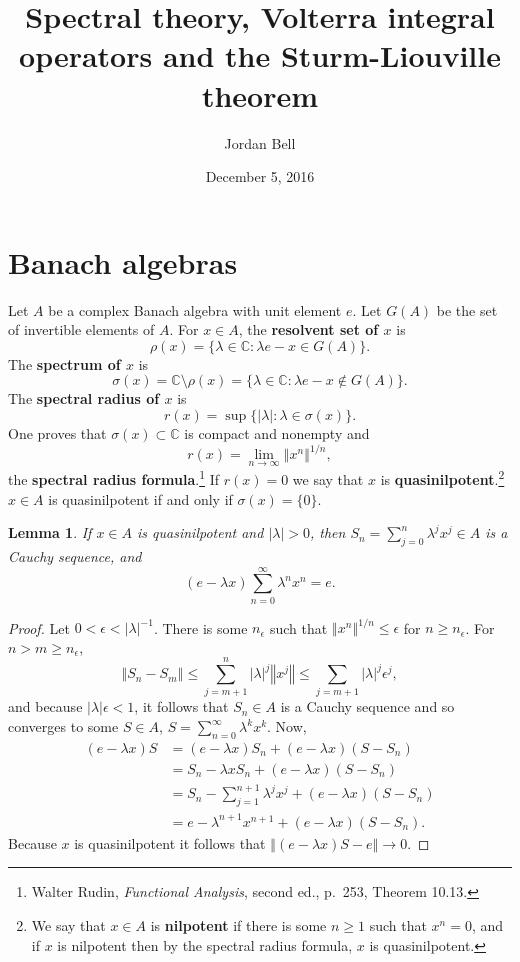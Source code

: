 \documentclass{article}
\newcommand{\norm}[1]{\left\Vert #1 \right\Vert}
\newtheorem{lemma}[theorem]{Lemma}
\theoremstyle{definition}
\begin{document}
\title{Spectral theory, Volterra integral operators and the Sturm-Liouville theorem}
\author{Jordan Bell}
\date{December 5, 2016}

\maketitle

\section{Banach algebras}
Let $A$ be a complex Banach algebra with unit element $e$. 
Let $G(A)$ be the set of invertible elements of $A$.
For $x \in A$, the \textbf{resolvent set of $x$} is
\[
\rho(x) = \{\lambda \in \mathbb{C}: \lambda e-x  \in G(A)\}.
\]
The 
\textbf{spectrum of $x$} is
\[
\sigma(x) = \mathbb{C} \setminus \rho(x) = \{ \lambda \in \mathbb{C}: \lambda e-x  \not \in G(A)\}.
\]
The \textbf{spectral radius of $x$} is
\[
r(x) = \sup \{|\lambda| : \lambda \in \sigma(x)\}.
\]
One proves that $\sigma(x) \subset \mathbb{C}$ is compact and nonempty and
\[
r(x) = \lim_{n \to \infty} \norm{x^n}^{1/n},
\]
the \textbf{spectral radius formula}.\footnote{Walter Rudin, {\em Functional Analysis}, second ed., p.~253, Theorem 10.13.}
If $r(x)=0$ we say that $x$ is \textbf{quasinilpotent}.\footnote{We say that $x \in A$ is \textbf{nilpotent} if there is some $n \geq 1$ such that $x^n=0$,
and if $x$ is nilpotent then by the spectral radius formula, $x$ is quasinilpotent.}
$x \in A$ is quasinilpotent if and only if $\sigma(x)=\{0\}$.


\begin{lemma}
If  $x \in A$ is quasinilpotent and $|\lambda|>0$, then
$S_n = \sum_{j=0}^n \lambda^j x^j \in A$ is a Cauchy sequence, and
\[
(e-\lambda x)\sum_{n=0}^\infty \lambda^n x^n = e.
\]
\end{lemma}
\begin{proof}
Let $0<\epsilon < |\lambda|^{-1}$. There is some
$n_\epsilon$ such that $\norm{x^n}^{1/n}\leq \epsilon$ for $n \geq n_\epsilon$. 
For $n>m \geq n_\epsilon$,
\[
\norm{S_n-S_m} \leq \sum_{j=m+1}^n |\lambda|^j \norm{x^j}
\leq \sum_{j=m+1} |\lambda|^j \epsilon^j,
\]
and because $|\lambda| \epsilon<1$, it follows that $S_n \in A$ is a Cauchy sequence and so converges to 
some $S \in A$, $S = \sum_{n=0}^\infty \lambda^k x^k$. 
Now,
\begin{align*}
(e-\lambda x)S &= (e-\lambda x)S_n+(e-\lambda x)(S-S_n)\\
&=S_n - \lambda x S_n + (e-\lambda x)(S-S_n)\\
&=S_n - \sum_{j=1}^{n+1} \lambda^j x^j + (e-\lambda x)(S-S_n)\\
&=e-\lambda^{n+1} x^{n+1}+(e-\lambda x)(S-S_n).
\end{align*}
Because $x$ is quasinilpotent it follows that $\norm{(e-\lambda x)S - e} \to 0$. 
\end{proof}
\end{document}

